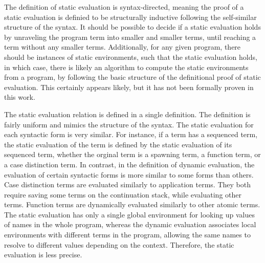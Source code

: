 \documentclass[letterpaper, 11pt]{report}
\begin{document}
The definition of static evaluation is syntax-directed, meaning the proof of a static evaluation
is definied to be structurally inductive following the self-similar structure of the syntax.
It should be possible to decide if a static evaluation holds
by unraveling the program term into smaller and smaller terms,
until reaching a term without any smaller terms.
Additionally, for any given program, there should be instances of static environments,
such that the static evaluation holds, in which case,
there is likely an algorithm to compute the static environments from a program,
by following the basic structure of the definitional proof of static evaluation.
This certainly appears likely, but it has not been formally proven in this work.

The static evaluation relation is defined in a single definition.
The definition is fairly uniform and mimics the structure of the syntax.
The static evaluation for each syntactic form is very similar.
For instance, if a term has a sequenced term,
the static evaluation of the term is defined
by the static evaluation of its sequenced term,
whether the orginal term is a spawning term, a function term, or a case distinction term.
In contrast, in the definition of dynamic evaluation,
the evaluation of certain syntactic forms is more similar to some forms than others.
Case distinction terms are evaluated similarly to application terms. They both require
saving some terms on the continuation stack, while evaluating other terms.
Function terms are dynamically evaluated similarly to other atomic terms.
The static evaluation has only a single global environment for
looking up values of names in the whole program, whereas the dynamic evaluation
associates local environments with different terms in the program, allowing the same
names to resolve to different values depending on the context. Therefore, the
static evaluation is less precise.
\end{document}
